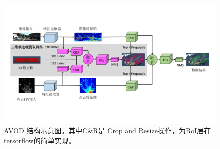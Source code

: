 \begin{figure}[!t]
	\centering
	\includegraphics[trim={1cm, 3.5cm, 1cm, 3.5cm}, clip,width=\textwidth]{./imgs/avod.pdf}
	\caption{AVOD 结构示意图\cite{ku2018joint}。其中C\&R是 Crop and Resize操作，为RoI层在tersorflow的简单实现。}
	\label{fig:avod}
\end{figure}
